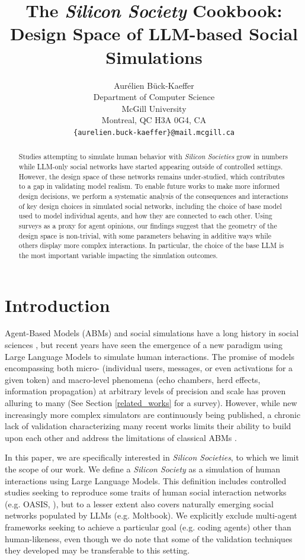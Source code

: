 \documentclass{article} %
\title{The \textit{Silicon Society} Cookbook:\\ %
 Design Space of LLM-based Social Simulations}
\author{Aurélien Bück-Kaeffer \\
Department of Computer Science\\
McGill University\\
Montreal, QC H3A 0G4, CA \\
\texttt{\{aurelien.buck-kaeffer\}@mail.mcgill.ca}
}
\begin{document}
\ifcolmsubmission
\linenumbers
\fi

\maketitle

\begin{abstract}
Studies attempting to simulate human behavior with \textit{Silicon Societies} grow in numbers while LLM-only social networks have started appearing outside of controlled settings. However, the design space of these networks remains under-studied, which contributes to a gap in validating model realism. To enable future works to make more informed design decisions, we perform a systematic analysis of the consequences and interactions of key design choices in simulated social networks, including the choice of base model used to model individual agents, and how they are connected to each other. Using surveys as a proxy for agent opinions, our findings suggest that the geometry of the design space is non-trivial, with some parameters behaving in additive ways while others display more complex interactions. In particular, the choice of the base LLM is the most important variable impacting the simulation outcomes.
\end{abstract}

\section{Introduction}

Agent-Based Models (ABMs) and social simulations have a long history in social sciences \citep{de2014agent}, but recent years have seen the emergence of a new paradigm using Large Language Models to simulate human interactions. The promise of models encompassing both micro- (individual users, messages, or even activations for a given token) and macro-level phenomena (echo chambers, herd effects, information propagation) at arbitrary levels of precision and scale has proven alluring to many (See Section \ref{related_works} for a survey). However, while new increasingly more complex simulators are continuously being published, a chronic lack of validation characterizing many recent works limits their ability to build upon each other and address the limitations of classical ABMs \citep{li2025llmgeneratedpersonapromise,larooij2025largelanguagemodelssolve}.

In this paper, we are specifically interested in \textit{Silicon Societies}, to which we limit the scope of our work. We define a \textit{Silicon Society} as a simulation of human interactions using Large Language Models. This definition includes controlled studies seeking to reproduce some traits of human social interaction networks (e.g. OASIS, \cite{yang2025oasisopenagentsocial}), but to a lesser extent also covers naturally emerging social networks populated by LLMs (e.g. Moltbook). We explicitly exclude multi-agent frameworks seeking to achieve a particular goal (e.g. coding agents) other than human-likeness, even though we do note that some of the validation techniques they developed may be transferable to this setting. %
\end{document}
